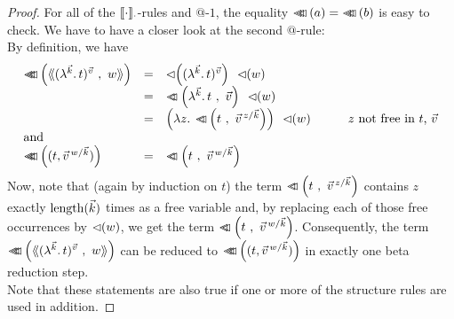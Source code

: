 \documentclass[submission,copyright,creativecommons]{eptcs}
\begin{document}
\begin{proof}
 For all of the $\ev \cdot \cdot$-rules and $@\mbox{-1}$, the equality $\prTree a = \prTree b$ is easy to check. 
 We have to have a closer look at the second $@$-rule:\\
 By definition, we have 
 \[
\begin{array}{lclr}
 \prTree {\tree {\Val {\vec k} t {\vec v}}{w}} & = & \ApA {  \prVal {\Val {\vec k} t {\vec v}}   } \ {\prVal w}  & \\
& = &\ApA {  \pr{\LaO {\vec k} t}{\vec v}   }  \ {\prVal w} \\
& = & \ApA {\left( \LaA z {\pr {t} {\multiinsert {\vec v}{\vec k}{z}}} \right)} \ {\prVal w} &  \qquad \mbox{$z$ not free in $t$, $\vec v$}\\
\mbox{and} &&& \\
 \prTree {    (t , \multiinsert{\vec v}{\vec k}{w} )    } & = & \pr{t}{\multiinsert{\vec v}{\vec k}{w}} &
\end{array}
\]
Now, note that (again by induction on $t$) the term $\pr {t} {\multiinsert {\vec v}{\vec k}{z}}$ contains  $z$ exactly $\length {\vec k}$ times as a free variable and, by replacing each of those free occurrences  by $\prVal w$, we get the term $\pr{t}{\multiinsert{\vec v}{\vec k}{w}}$.
Consequently, the term $\prTree {\tree {\Val {\vec k} t {\vec v}}{w}}$ can be reduced to $\prTree {    (t , \multiinsert{\vec v}{\vec k}{w} )    }$ in exactly one beta reduction step. \\
Note that these statements are also true if one or more of the structure rules are used in addition.


\end{proof}
\end{document}
